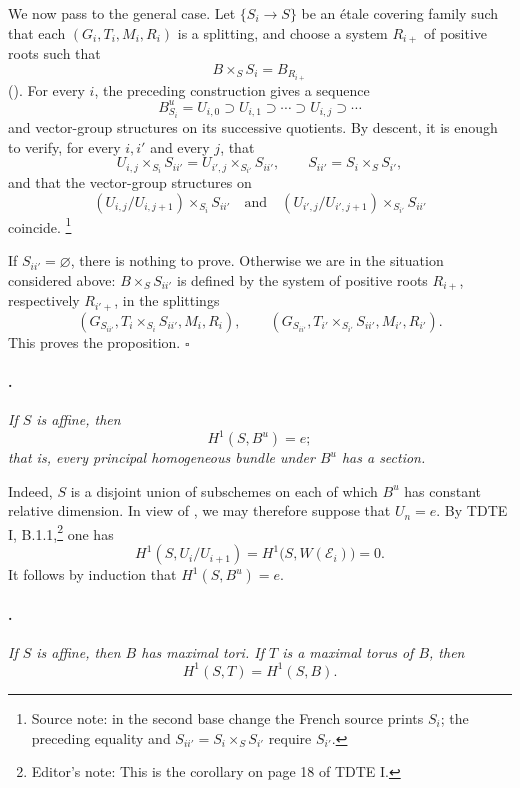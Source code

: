 We now pass to the general case. Let \(\{S_i\to S\}\) be an étale
covering family such that each
\((G_i,T_i,M_i,R_i)\) is a splitting, and choose a system
\(R_{i+}\) of positive roots such that
\[
  B\times_S S_i=B_{R_{i+}}
\]
\textup{(\textup{})}. For every \(i\), the preceding
construction gives a sequence
\[
  B_{S_i}^u=U_{i,0}
  \supset U_{i,1}\supset\cdots
  \supset U_{i,j}\supset\cdots
\]
and vector-group structures on its successive quotients.
By descent, it is enough to verify, for every \(i,i'\) and every
\(j\), that
\[
  U_{i,j}\times_{S_i}S_{ii'}
  =
  U_{i',j}\times_{S_{i'}}S_{ii'},
  \qquad
  S_{ii'}=S_i\times_S S_{i'},
\]
and that the vector-group structures on
\[
  (U_{i,j}/U_{i,j+1})\times_{S_i}S_{ii'}
  \quad\text{and}\quad
  (U_{i',j}/U_{i',j+1})\times_{S_{i'}}S_{ii'}
\]
coincide.\begingroup
\renewcommand{\thefootnote}{*}\footnote{Source note: in the second
base change the French source prints \(S_i\); the preceding equality
and \(S_{ii'}=S_i\times_S S_{i'}\) require \(S_{i'}\).}
\addtocounter{footnote}{-1}\endgroup
If \(S_{ii'}=\varnothing\), there is nothing to prove. Otherwise we
are in the situation considered above: \(B\times_S S_{ii'}\) is
defined by the system of positive roots \(R_{i+}\), respectively
\(R_{i'+}\), in the splittings
\[
  (G_{S_{ii'}},
   T_i\times_{S_i}S_{ii'},M_i,R_i),
  \qquad
  (G_{S_{ii'}},
   T_{i'}\times_{S_{i'}}S_{ii'},M_{i'},R_{i'}).
\]
This proves the proposition.
\hfill\(\square\)

\paragraph{.}
{\itshape If \(S\) is affine, then
\[
  H^1(S,B^u)=e;
\]
that is, every principal homogeneous bundle under \(B^u\) has a
section.}

Indeed, \(S\) is a disjoint union of subschemes on each of which
\(B^u\) has constant relative dimension. In view of
\textup{}, we may therefore suppose that \(U_n=e\).
By TDTE I, B.1.1,\setcounter{footnote}{55}\footnote{Editor's note:
This is the corollary on
page 18 of TDTE I.} one has
\[
  H^1(S,U_i/U_{i+1})
  =
  H^1\bigl(S,W(\mathcal E_i)\bigr)
  =
  0.
\]
It follows by induction that \(H^1(S,B^u)=e\).

\paragraph{.}
{\itshape If \(S\) is affine, then \(B\) has maximal tori. If \(T\)
is a maximal torus of \(B\), then
\[
  H^1(S,T)=H^1(S,B).
\]}

